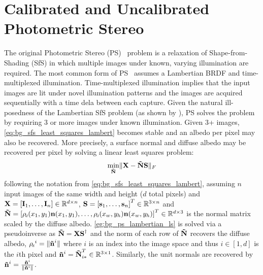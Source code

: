 \section{Calibrated and Uncalibrated Photometric Stereo}\label{ch:bg_ps}
The original Photometric Stereo (PS)~\cite{woodham1980photometric} problem
is a relaxation of Shape-from-Shading (SfS) in which multiple images under
known, varying illumination are required. The most common form of
PS~\cite{woodham1980photometric} assumes a Lambertian BRDF and time-multiplexed 
illumination. Time-multiplexed illumination implies that the input images
are lit under novel illumination patterns and the images are acquired 
sequentially with a time dela between each capture. Given the natural
ill-posedness of the Lambertian SfS problem (as shown by
), PS solves the problem by requiring
3 or more images under known illumination. Given 3+ images,
\cref{eq:bg_sfs_least_squares_lambert} becomes stable and an albedo per pixel 
may also be recovered. More precisely, a surface normal and diffuse albedo
may be recovered per pixel by solving a linear least squares problem:
\begin{equation}\label{eg:bg_ps_lambertian_ls}
	 \min_{\boldsymbol{\mathbf{\tilde{N}}}} \lVert \boldsymbol{\mathbf{X}} - \boldsymbol{\mathbf{\tilde{N}}} \boldsymbol{\mathbf{S}} \rVert_F
\end{equation}
following the notation from \cref{eq:bg_sfs_least_squares_lambert},
assuming $n$ input images of the same width and height ($d$ total pixels) and
$\boldsymbol{\mathbf{X}} = [\boldsymbol{\mathbf{I}}_1, \ldots, \boldsymbol{\mathbf{I}}_n] \in \mathbb{R}^{d \times n}$, 
$\boldsymbol{\mathbf{S}} = {[\boldsymbol{\mathbf{s}}_1, \ldots, \boldsymbol{\mathbf{s}}_n]}^T \in \mathbb{R}^{3 \times n}$ and
$\bb{\tilde{N}} = \nobreak {[\rho_{\smallsub{d}}(x_1, y_1)\bb{n}(x_1, y_1), \ldots, \rho_{\smallsub{d}}(x_w, y_h)\bb{n}(x_w, y_h)]}^T \in \R^{d \times 3}$ 
is the normal matrix scaled by the diffuse
albedo. \cref{eg:bg_ps_lambertian_ls} is solved via a
pseudoinverse as $\boldsymbol{\mathbf{\tilde{N}}} = \boldsymbol{\mathbf{X}} \boldsymbol{\mathbf{S}}^{\dagger}$ and the norm of each
row of $\boldsymbol{\mathbf{\tilde{N}}}$ recovers the diffuse albedo,
${\rho_{\smallsub{d}}}^i = \norm{\bb{\tilde{n}}^i}$ 
where $i$ is an index into the image space and thus $i \in [1, d]$ 
is the $i$th pixel and
$\boldsymbol{\mathbf{\tilde{n}}}^i = \boldsymbol{\mathbf{\tilde{N}}}_{i\ast}^T \in \mathbb{R}^{3 \times 1}$.
Similarly, the unit normals are recovered by
$\boldsymbol{\mathbf{\tilde{n}}}^i = \frac{\boldsymbol{\mathbf{\tilde{n}}}^i}{\lVert{} \boldsymbol{\mathbf{\tilde{n}}}^i \rVert}$.
